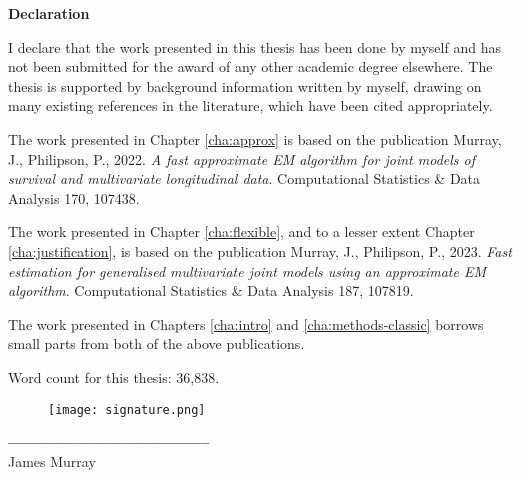 \begin{center}
{\Huge \bf Declaration}
\end{center}
\noindent

    I declare that the work presented in this thesis has been done by myself and has not been submitted for the award of any other academic degree elsewhere. The thesis is supported by background information written by myself, drawing on many existing references in the literature, which have been cited appropriately.

    The work presented in Chapter \ref{cha:approx} is based on the publication Murray, J., Philipson, P., 2022. \textit{A fast approximate EM algorithm for joint models of survival and multivariate longitudinal data}. Computational Statistics \& Data Analysis 170, 107438.

    The work presented in Chapter \ref{cha:flexible}, and to a lesser extent Chapter \ref{cha:justification}, is based on the publication Murray, J., Philipson, P., 2023. \textit{Fast estimation for generalised multivariate joint models using an approximate EM algorithm}. Computational Statistics \& Data Analysis 187, 107819.

    The work presented in Chapters \ref{cha:intro} and \ref{cha:methods-classic} borrows small parts from both of the above publications.

    Word count for this thesis: 36,838.

    \vspace{5mm}
    \begin{flushright}
        \begin{figure}[H]
            \texttt{[image: signature.png]}
        \end{figure}
        \vspace*{-15mm}
        \textbf{--------------------------------------}\\
        \vspace*{-2mm}
        \Large James Murray
    \end{flushright}

    
\thispagestyle{empty}
\restoregeometry